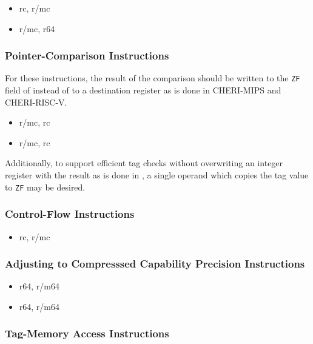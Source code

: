 \begin{itemize}
  \item {} rc, r/mc
  \item {} r/mc, r64
\end{itemize}

\subsubsection{Pointer-Comparison Instructions}

For these instructions, the result of the comparison should be written
to the \texttt{ZF} field of \RFLAGS{} instead of to a destination
register as is done in CHERI-MIPS and CHERI-RISC-V.

\begin{itemize}
  \item {} r/mc, rc
  \item {} r/mc, rc
\end{itemize}

Additionally, to support efficient tag checks without overwriting an
integer register with the result as is done in , a
single operand  which copies the tag value to
\texttt{ZF} may be desired.

\subsubsection{Control-Flow Instructions}

\begin{itemize}
  \item {} rc, r/mc
\end{itemize}

\subsubsection{Adjusting to Compresssed Capability Precision
  Instructions}

\begin{itemize}
  \item {} r64, r/m64
  \item {} r64, r/m64
\end{itemize}

\subsubsection{Tag-Memory Access Instructions}

